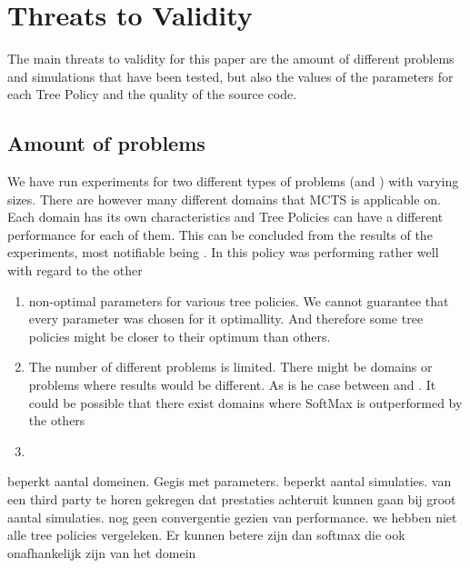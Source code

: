 \section{Threats to Validity}
The main threats to validity for this paper are the amount of different problems and simulations that have been tested, but also the values of the parameters for each Tree Policy and the quality of the source code. 

\subsection{Amount of problems}
We have run experiments for two different types of problems (\rock and \poc) with varying sizes. There are however many different domains that MCTS is applicable on. Each domain has its own characteristics and Tree Policies can have a different performance for each of them. This can be concluded from the results of the experiments, most notifiable being \eroulette. In \rock this policy was performing rather well with regard to the other 





\begin{enumerate}
\item non-optimal parameters for various tree policies. We cannot guarantee that every parameter was chosen for it optimallity. And therefore some tree policies might be closer to their optimum than others. 
\item The number of different problems is limited. There might be domains or problems where results would be different. As is he case between \rock and \poc. It could be possible that there exist domains where SoftMax is outperformed by the others
\item 
\end{enumerate}

beperkt aantal domeinen. 
Gegis met parameters.
beperkt aantal simulaties. van een third party te horen gekregen dat prestaties achteruit kunnen gaan bij groot aantal simulaties. 
nog geen convergentie gezien van performance. 
we hebben niet alle tree policies vergeleken. Er kunnen betere zijn dan softmax die ook onafhankelijk zijn van het domein